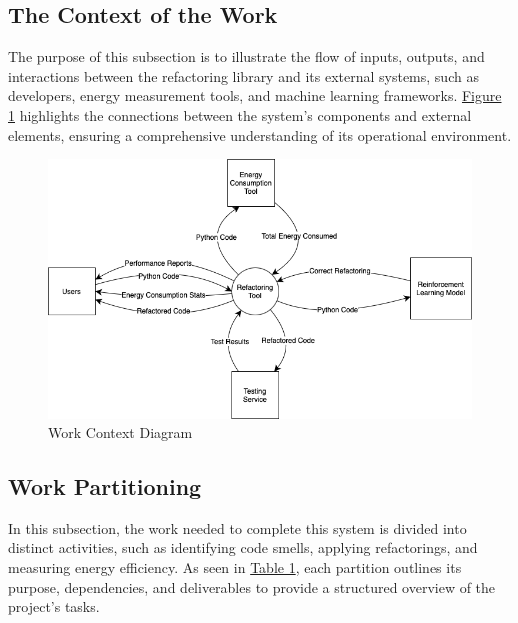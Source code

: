 \documentclass[12pt]{article}
\begin{document}
\subsection{The Context of the Work}
The purpose of this subsection is to illustrate the flow of inputs, outputs, and interactions between the refactoring library and its external systems, such as developers, energy measurement tools, and machine learning frameworks. \hyperref[img:work-context]{Figure 1} highlights the connections between the system's components and external elements, ensuring a comprehensive understanding of its operational environment.

\begin{figure}[H]
  \centering
  \includegraphics[scale=0.5]{../Images/WorkContextModel.png}
  \caption{Work Context Diagram}
  \label{img:work-context}
\end{figure}

\newpage
\subsection{Work Partitioning}
In this subsection, the work needed to complete this system is divided into distinct activities, such as identifying code smells, applying refactorings, and measuring energy efficiency. As seen in \hyperref[tab:work-part]{Table 1}, each partition outlines its purpose, dependencies, and deliverables to provide a structured overview of the project's tasks.
\end{document}
